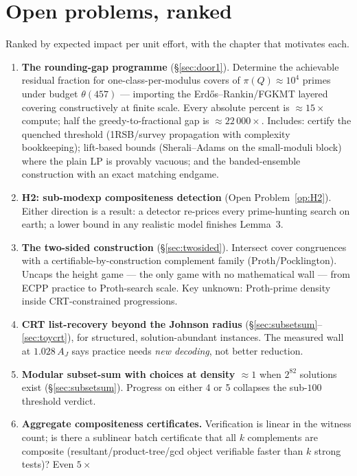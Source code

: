 \section{Open problems, ranked}\label{sec:open}

Ranked by expected impact per unit effort, with the chapter that
motivates each.

\begin{enumerate}
\item \textbf{The rounding-gap programme}
(\S\ref{sec:door1}). Determine the achievable residual fraction for
one-class-per-modulus covers of $\pi(Q)\approx10^4$ primes under
budget $\theta(457)$ --- importing the Erd\H{o}s--Rankin/FGKMT layered
covering constructively at finite scale. Every absolute percent is
$\approx15\times$ compute; half the greedy-to-fractional gap is
$\approx22\,000\times$. Includes: certify the quenched threshold
(1RSB/survey propagation with complexity bookkeeping); lift-based
bounds (Sherali--Adams on the small-moduli block) where the plain LP is
provably vacuous; and the banded-ensemble construction with an exact
matching endgame.
\item \textbf{H2: sub-modexp compositeness detection}
(Open Problem~\ref{op:H2}). Either direction is a result: a detector
re-prices every prime-hunting search on earth; a lower bound in any
realistic model finishes Lemma~3.
\item \textbf{The two-sided construction} (\S\ref{sec:twosided}).
Intersect cover congruences with a certifiable-by-construction
complement family (Proth/Pocklington). Uncaps the height game ---
the only game with no mathematical wall --- from ECPP practice to
Proth-search scale. Key unknown: Proth-prime density inside
CRT-constrained progressions.
\item \textbf{CRT list-recovery beyond the Johnson radius}
(\S\ref{sec:subsetsum}--\ref{sec:toycrt}), for structured,
solution-abundant instances. The measured wall at $1.028\,A_J$ says
practice needs \emph{new decoding}, not better reduction.
\item \textbf{Modular subset-sum with choices at density
$\approx1$} when $2^{82}$ solutions exist (\S\ref{sec:subsetsum}).
Progress on either 4 or 5 collapses the sub-$100$ threshold verdict.
\item \textbf{Aggregate compositeness certificates.} Verification is
linear in the witness count; is there a sublinear batch certificate
that all $k$ complements are composite (resultant/product-tree/gcd
object verifiable faster than $k$ strong tests)? Even $5\times$

\end{enumerate}
